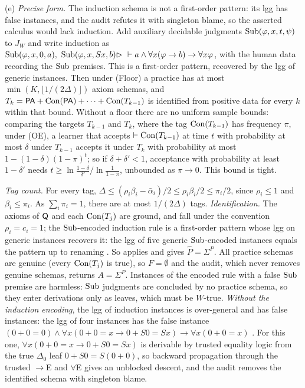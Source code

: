 (e) \emph{Precise form.} The induction schema is not a first-order pattern: its lgg has false instances, and the audit refutes it with singleton blame, so the asserted calculus would lack induction. Add auxiliary decidable judgments $\mathrm{Sub}(\varphi,x,t,\psi)$ to $J_W$ and write induction as $\Sub(\varphi,x,0,a),\ \Sub(\varphi,x,Sx,b)\step\ \der a\wedge\forall x(\varphi\to b)\to\forall x\varphi$, with the human data recording the $\mathrm{Sub}$ premises. This is a first-order pattern, recovered by the lgg of generic instances. Then under (Floor) a practice has at most $\min(K,\lfloor1/(2\Delta)\rfloor)$ axiom schemas, and $T_k=\mathsf{PA}+\mathrm{Con}(\mathsf{PA})+\dots+\mathrm{Con}(T_{k-1})$ is identified from positive data for every $k$ within that bound. Without a floor there are no uniform sample bounds: comparing the targets $T_{k-1}$ and $T_k$, where the tag $\mathrm{Con}(T_{k-1})$ has frequency $\pi$, under (OE), a learner that accepts $\vdash\mathrm{Con}(T_{k-1})$ at time $t$ with probability at most $\delta$ under $T_{k-1}$ accepts it under $T_k$ with probability at most $1-(1-\delta)(1-\pi)^t$; so if $\delta+\delta'<1$, acceptance with probability at least $1-\delta'$ needs $t\ge\ln\frac{1-\delta}{\delta'}\big/\ln\frac1{1-\pi}$, unbounded as $\pi\to0$. This bound is tight.

\emph{Tag count.} For every tag, $\Delta\le(\rho_i\beta_i-\bar\alpha_i)/2\le\rho_i\beta_i/2\le\pi_i/2$, since $\rho_i\le1$ and $\beta_i\le\pi_i$. As $\sum_i\pi_i=1$, there are at most $1/(2\Delta)$ tags. \emph{Identification.} The axioms of $\mathsf{Q}$ and each $\mathrm{Con}(T_j)$ are ground, and fall under the convention $\rho_i=c_i=1$; the $\mathrm{Sub}$-encoded induction rule is a first-order pattern whose lgg on generic instances recovers it: the lgg of five generic $\mathrm{Sub}$-encoded instances equals the pattern up to renaming . So  applies and  gives $\hat P=\Sigma^P$. All practice schemas are genuine (every $\mathrm{Con}(T_j)$ is true), so $F=\emptyset$ and the audit, which never removes genuine schemas, returns $A=\Sigma^P$. Instances of the encoded rule with a false $\mathrm{Sub}$ premise are harmless: $\mathrm{Sub}$ judgments are concluded by no practice schema, so they enter derivations only as leaves, which must be $W$-true. \emph{Without the induction encoding}, the lgg of induction instances is over-general and has false instances: the lgg of four instances has the false instance $(0+0=0)\wedge\forall x(0+0=x\to0+S0=Sx)\to\forall x(0+0=x)$ . For this one, $\forall x(0+0=x\to0+S0=Sx)$ is derivable by trusted equality logic from the true $\Delta_0$ leaf $0+S0=S(0+0)$, so backward propagation through the trusted $\to$E and $\forall$E gives an unblocked descent, and the audit removes the identified schema with singleton blame.

